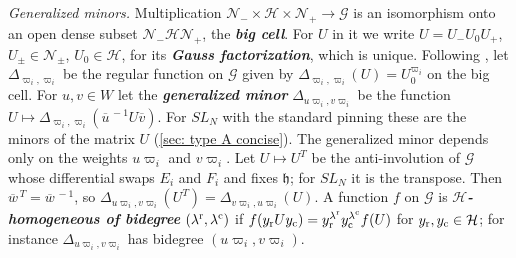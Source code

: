 \documentclass[a4paper]{amsart}
\numberwithin{equation}{section}
\theoremstyle{definition}
\theoremstyle{remark}
\newcommand{\mfh}{\mathfrak{h}}
\newcommand{\mcG}{\mathcal{G}}
\newcommand{\mcH}{\mathcal{H}}
\newcommand{\mcN}{\mathcal{N}}
\newcommand{\rr}{{\rm r}}
\newcommand{\cc}{{\rm c}}
\newcommand{\newword}[1]{\textbf{\emph{#1}}}
\begin{document}
\emph{Generalized minors.}
Multiplication $\mcN_-\times\mcH\times\mcN_+\to\mcG$ is an isomorphism onto an open dense subset $\mcN_-\mcH\mcN_+$, the \newword{big cell}.
  For $U$ in it we write $U=U_-U_0U_+$, $U_\pm\in\mcN_\pm$, $U_0\in\mcH$, for its \newword{Gauss factorization}, which is unique.
Following \cite{FZ99}, let $\Delta_{\varpi_i,\varpi_i}$ be the regular function on $\mcG$ given by $\Delta_{\varpi_i,\varpi_i}(U)=U_0^{\varpi_i}$ on the big cell.
For $u,v\in W$ let the \newword{generalized minor} $\Delta_{u\varpi_i,v\varpi_i}$ be the function $U\mapsto\Delta_{\varpi_i,\varpi_i}(\overline{u}^{\,-1}U\overline{v})$.
For $SL_N$ with the standard pinning these are the minors of the matrix $U$ (\cref{sec: type A concise}).
The generalized minor depends only on the weights $u\varpi_i$ and $v\varpi_i$.
Let $U\mapsto U^T$ be the anti-involution of $\mcG$ whose differential swaps $E_i$ and $F_i$ and fixes $\mfh$; for $SL_N$ it is the transpose.
Then $\overline{w}^{\,T}=\overline{w}^{\,-1}$, so $\Delta_{u\varpi_i,v\varpi_i}(U^T)=\Delta_{v\varpi_i,u\varpi_i}(U)$.
A function $f$ on $\mcG$ is \newword{$\mcH$-homogeneous of bidegree} $(\lambda^\rr,\lambda^\cc)$ if $f(y_{\rr}Uy_{\cc})=y_{\rr}^{\lambda^\rr}y_{\cc}^{\lambda^\cc}f(U)$ for $y_{\rr},y_{\cc}\in\mcH$; for instance $\Delta_{u\varpi_i,v\varpi_i}$ has bidegree $(u\varpi_i,v\varpi_i)$.
\end{document}
